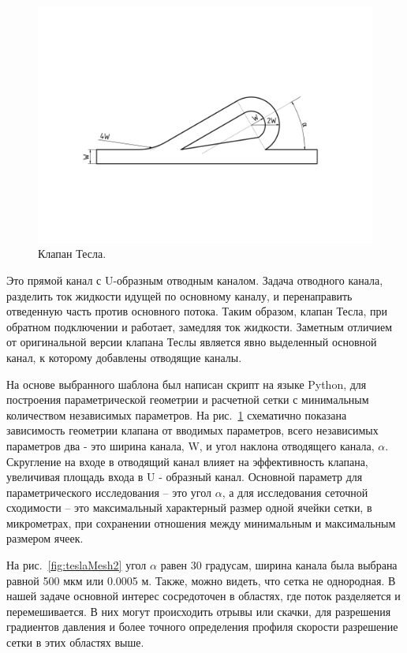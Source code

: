 \documentclass[10pt,a4paper]{book}
\begin{document}
    \begin{figure}[H]
        \centering
        \includegraphics[width = 1\linewidth]{teslaDesign}
        \caption{Клапан Тесла.}
        \label{fig:td}
    \end{figure}
    
    Это прямой канал с U-образным отводным каналом. Задача отводного канала, разделить ток жидкости идущей по основному каналу, и перенаправить отведенную часть против основного потока. Таким образом, клапан Тесла, при обратном подключении и работает, замедляя ток жидкости. Заметным отличием от оригинальной версии клапана Теслы является явно выделенный основной канал, к которому добавлены отводящие каналы.          
    
    На основе выбранного шаблона был написан скрипт на языке Python, для построения параметрической геометрии и расчетной сетки с минимальным количеством независимых параметров. На рис.~\ref{fig:td} схематично показана зависимость геометрии клапана от вводимых параметров, всего независимых параметров два - это ширина канала, W, и угол наклона отводящего канала, $ \alpha  $. Скругление на входе в отводящий канал влияет на эффективность клапана, увеличивая площадь входа в U - образный канал. Основной параметр для параметрического исследования -- это угол $ \alpha  $, а для исследования сеточной сходимости -- это максимальный характерный размер одной ячейки сетки, в микрометрах, при сохранении отношения между минимальным и максимальным размером ячеек.
    
    На рис.~\ref{fig:teslaMesh2} угол $\alpha$ равен 30 градусам, ширина канала была выбрана равной 500 мкм или 0.0005 м. Также, можно видеть, что сетка не однородная. В нашей задаче основной интерес сосредоточен в областях, где поток разделяется и перемешивается. В них могут происходить отрывы или скачки, для разрешения градиентов давления и более точного определения профиля скорости разрешение сетки в этих областях выше.
    
\end{document}
